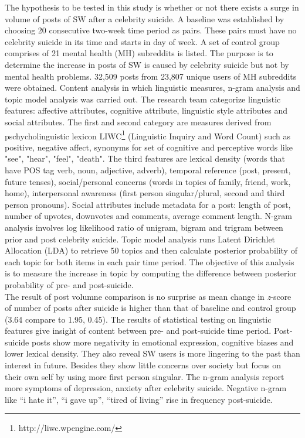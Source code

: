 The hypothesis to be tested in this study is whether or not there exists a surge in volume of posts of SW after a celebrity suicide. A baseline was established by choosing 20 consecutive two-week time period as pairs. These pairs must have no celebrity suicide in its time and starts in day of week. A set of control group comprises of 21 mental health (MH) subreddits is listed. The purpose is to determine the increase in posts of SW is caused by celebrity suicide but not by mental health problems. 32,509 posts from 23,807 unique users of MH subreddits were obtained. Content analysis in which linguistic measures, n-gram analysis and topic model analysis was carried out. The research team categorize linguistic features: affective attributes, cognitive attribute, linguistic style attributes and social attributes. The first and second category are measures derived from pschycholinguistic lexicon LIWC\footnote{http://liwc.wpengine.com/} (Linguistic Inquiry and Word Count) such as positive, negative affect, synonyms for set of cognitive and perceptive words like "see", "hear", "feel", "death". The third features are lexical density (words that have POS tag verb, noun, adjective, adverb), temporal reference (post, present, future tenses), social/personal concerns (words in topics of family, friend, work, home), interpersonal awareness (first person singular/plural, second and third person pronouns). Social attributes include metadata for a post: length of post, number of upvotes, downvotes and comments, average comment length. N-gram analysis involves log likelihood ratio of unigram, bigram and trigram between prior and post celebrity suicide. Topic model analysis runs Latent Dirichlet Allocation (LDA) \cite{Blei2003} to retrieve 50 topics and then calculate posterior probability of each topic for both items in each pair time period. The objective of this analysis is to measure the increase in topic by computing the difference between posterior probability of pre- and post-suicide.\\
The result of post volumne comparison is no surprise as mean change in \textit{z}-score of number of posts after suicide is higher than that of baseline and control group (3.64 compare to 1.95, 0.45). The results of statistical testing on linguistic features give insight of content between pre- and post-suicide time period. Post-suicide posts show more negativity in emotional expression, cognitive biases and lower lexical density. They also reveal SW users is more lingering to the past than interest in future. Besides they show little concerns over society but focus on their own self by using more first person singular. The n-gram analysis report more symptoms of depression, anxiety after celebrity suicide. Negative n-gram like “i hate it”, “i gave up”, “tired of living” rise in frequency post-suicide. \\
